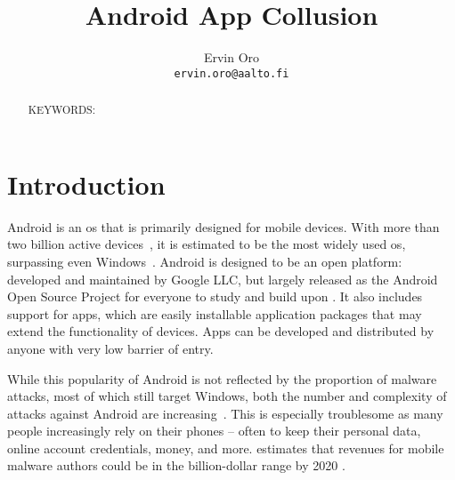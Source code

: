 \documentclass[article, oneside]{aaltoseries}
\title{Android App Collusion}
\author{Ervin Oro%
\\\textnormal{\texttt{ervin.oro@aalto.fi}}} %
\affiliation{\textbf{Tutor}: Jorden Whitefield} %
\newcommand{\TODO}[1]{\todo[inline]{#1}}
\begin{document}

\maketitle
{}

\begin{abstract}
\TODO{abstract}

\vspace{3mm}
\noindent KEYWORDS: 

\end{abstract}


\section{Introduction}
\label{sec:intro}

Android is an \gls{os} that is primarily designed for mobile devices. With more than two billion active devices~\cite{AOSP2018}, it is estimated to be the most widely used \gls{os}, surpassing even Windows~\cite{AWSLLC2018, StatCounter2018}. Android is designed to be an open platform: developed and maintained by Google LLC, but largely released as the Android Open Source Project for everyone to study and build upon \cite{AOSP2019c}. It also includes support for apps, which are easily installable application packages that may extend the functionality of devices. Apps can be developed and distributed by anyone with very low barrier of entry.

While this popularity of Android is not reflected by the proportion of malware attacks, most of which still target Windows, both the number and complexity of attacks against Android are increasing~\cite{AVTESTGH2018}. This is especially troublesome as many people increasingly rely on their phones -- often to keep their personal data, online account credentials, money, and more. \citeauthor{McAfee2018} estimates that revenues for mobile malware authors could be in the billion-dollar range by 2020 \cite{McAfee2018}.
\end{document}
